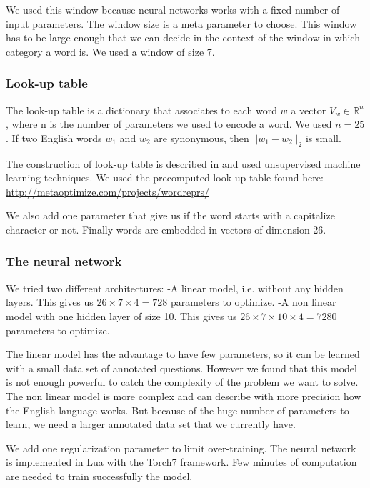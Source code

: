 We used this window because neural networks works with a fixed number of input parameters. 
The window size is a meta parameter to choose. This window has to be large enough that we can decide in the context of the window in which category a word is. We used a window of size 7.

\subsubsection{Look-up table}

The look-up table is a dictionary that associates to each word $w$ a vector $V_w \in \mathbb{R}^n$, where n is the number of parameters we used to encode a word. We used $n=25$.
If two English words $w_1$ and $w_2$ are synonymous, then $||w_1-w_2||_2$ is small.

The construction of look-up table is described in \cite{collobert} and used unsupervised machine learning techniques.
We used the precomputed look-up table found here: \url{http://metaoptimize.com/projects/wordreprs/}

We also add one parameter that give us if the word starts with a capitalize character or not. Finally words are embedded in vectors of dimension 26. 

\subsubsection{The neural network}

We tried two different architectures:
-A linear model, i.e. without any hidden layers. This gives us $26\times 7\times 4 = 728$ parameters to optimize. 
-A non linear model with one hidden layer of size 10. This gives us $26\times 7\times 10\times 4 = 7280$ parameters to optimize.

The linear model has the advantage to have few parameters, so it can be learned with a small data set of annotated questions. However we found that this model is not enough powerful to catch the complexity of the problem we want to solve.
The non linear model is more complex and can describe with more precision how the English language works. But because of the huge number of parameters to learn, we need a larger annotated data set that we currently have.

We add one regularization parameter to limit over-training.
The neural network is implemented in Lua with the Torch7 framework.
Few minutes of computation are needed to train successfully the model.

